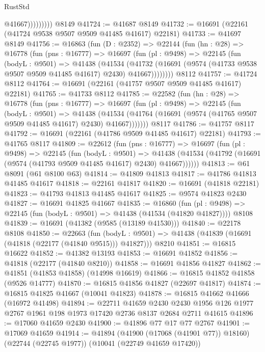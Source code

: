 \begin{lexlean}{RustStd}
\begin{coremodule}
                      @41667)))))))))
    @8149
@41724 := @41687 @8149
@41732 := @16691 (@22161 (@41724 @9538 @9507 @9509 @41485 @41617) @22181)
@41733 := @41697 @8149
@41756 := @16863
    (fun (D : @2352) =>
    @22144
      (fun (hn : @28) =>
      @16778
        (fun (pns : @16777) =>
        @16697
          (fun (pl : @9498) =>
          @22145
            (fun (bodyL : @9501) =>
            @41438
              (@41534
                (@41732
                  (@16691 (@9574 (@41733 @9538 @9507 @9509 @41485 @41617) @2430) @41667))))))))
    @8112
@41757 := @41724 @8112
@41764 := @16691 (@22161 (@41757 @9507 @9509 @41485 @41617) @22181)
@41765 := @41733 @8112
@41785 := @22582
    (fun (hn : @28) =>
    @16778
      (fun (pns : @16777) =>
      @16697
        (fun (pl : @9498) =>
        @22145
          (fun (bodyL : @9501) =>
          @41438
            (@41534 (@41764 (@16691 (@9574 (@41765 @9507 @9509 @41485 @41617) @2430) @41667)))))))
    @8117
@41786 := @41757 @8117
@41792 := @16691 (@22161 (@41786 @9509 @41485 @41617) @22181)
@41793 := @41765 @8117
@41809 := @22612
    (fun (pns : @16777) =>
    @16697
      (fun (pl : @9498) =>
      @22145
        (fun (bodyL : @9501) =>
        @41438 (@41534 (@41792 (@16691 (@9574 (@41793 @9509 @41485 @41617) @2430) @41667))))))
@41813 := @61 @8091 (@61 @8100 @63)
@41814 := @41809 @41813
@41817 := @41786 @41813 @41485 @41617
@41818 := @22161 @41817
@41820 := @16691 (@41818 @22181)
@41823 := @41793 @41813 @41485 @41617
@41825 := @9574 @41823 @2430
@41827 := @16691 @41825 @41667
@41835 := @16860
    (fun (pl : @9498) => @22145 (fun (bodyL : @9501) => @41438 (@41534 (@41820 @41827))))
    @8108
@41839 := @16691 (@41382 (@9585 (@13189 @41530)))
@41840 := @22178 @8108
@41850 := @22663
    (fun (bodyL : @9501) => @41438 (@41839 (@16691 (@41818 (@22177 (@41840 @9515))) @41827)))
    @8210
@41851 := @16815 @16622
@41852 := @41382 @13193
@41853 := @16691 @41852
@41856 := @41818 (@22177 (@41840 @8210))
@41858 := @16691 @41856 @41827
@41862 := @41851 (@41853 @41858) (@14998 @16619)
@41866 := @16815 @41852 @41858 (@9526 @14777)
@41870 := @16815 @41856 @41827 (@22697 @41817)
@41874 := @16815 @41825 @41667 (@10041 @41823)
@41878 := @16815 @41662 @41666 (@16972 @41498)
@41894 := @22711
    @41659
    @2430
    @2430
    @1956
    @126
    @1977
    @2767
    @1961
    @198
    @1973
    @17420
    @2736
    @8137
    @2684
    @2711
    @41615
@41896 := @17060 @41659 @2430
@41900 := @41896 @77 @17 @77 @2767
@41901 := @17069 @41659
@41914 := @41894
    (@41900 (@17068 (@41901 @77)) @18160)
    (@22744 (@22745 @1977))
    (@10041 (@22749 @41659 @17420))

\end{coremodule}
\end{lexlean}
